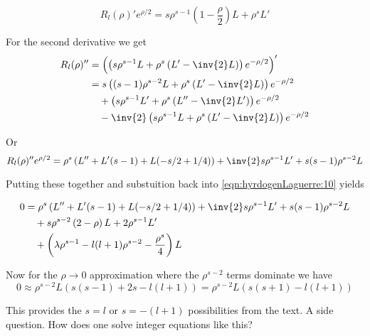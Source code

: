 \begin{equation}\label{eqn:hyrdogenLaguerre:30}
R_l(\rho)'  e^{\rho/2}
= s \rho^{s-1} \left(1 - \frac{\rho}{2}\right)L + \rho^s L' 
\end{equation}

For the second derivative we get
\begin{align*}
R_l(\rho)''
&= \left( \left( s \rho^{s-1} L + \rho^s \left(L' - \inv{2} L\right) \right) e^{-\rho/2}  \right)' \\
&= 
s
\left( (s-1) \rho^{s-2} L + \rho^s \left(L' - \inv{2} L\right) \right) e^{-\rho/2} \\
&\quad+\left( s \rho^{s-1} L' + \rho^s \left(L'' - \inv{2} L'\right) \right) e^{-\rho/2} \\
&\quad-\inv{2}\left( s \rho^{s-1} L + \rho^s \left(L' - \inv{2} L\right) \right) e^{-\rho/2} \\
\end{align*}

Or
\begin{equation}\label{eqn:hyrdogenLaguerre:40}
R_l(\rho)'' e^{\rho/2} 
=
\rho^s \left( L'' + L' (s - 1 ) + L (-s/2 + 1/4) \right)
+ \inv{2} s \rho^{s-1} L'
+ s(s-1) \rho^{s-2} L
\end{equation}

Putting these together and substuition back into \ref{eqn:hyrdogenLaguerre:10} yields

\begin{align*}
0 &= \rho^s \left( L'' + L' (s - 1 ) + L (-s/2 + 1/4) \right) 
+ \inv{2} s \rho^{s-1} L' 
+ s(s-1) \rho^{s-2} L \\
&\quad+ s \rho^{s-2} \left(2 - \rho\right)L + 2 \rho^{s-1} L'  \\
&\quad+\left( \lambda\rho^{s-1} - l(l+1) \rho^{s-2} - \frac{\rho^s}{4} \right) L 
\end{align*}

Now for the $\rho \rightarrow 0$ approximation where the $\rho^{s-2}$ terms dominate we have
\begin{equation}\label{eqn:hyrdogenLaguerre:50}
0 \approx 
\rho^{s-2} L \left(
s(s-1) + 2 s - l(l+1) 
\right)
=
\rho^{s-2} L \left(
s(s+1) - l(l+1) 
\right)
\end{equation}

This provides the $s=l$ or $s = -(l+1)$ possibilities from the text.  A side question.  How does one solve integer equations like this?

\EndArticle
